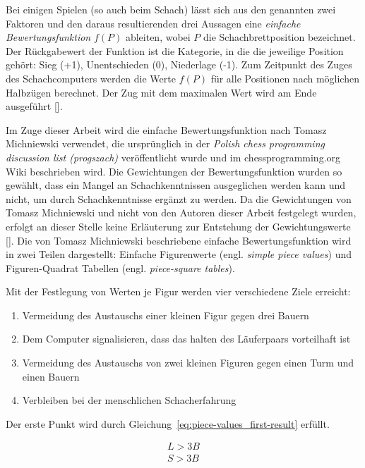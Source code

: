 \noindent Bei einigen Spielen (so auch beim Schach) lässt sich aus den genannten zwei Faktoren und den daraus resultierenden drei Aussagen eine \textit{einfache Bewertungsfunktion} \(\displaystyle f(P)\) ableiten, wobei \(\displaystyle P\) die Schachbrettposition bezeichnet.
Der Rückgabewert der Funktion ist die Kategorie, in die die jeweilige Position gehört: Sieg (+1), Unentschieden (0), Niederlage (-1).
Zum Zeitpunkt des Zuges des Schachcomputers werden die Werte \(\displaystyle f(P)\) für alle Positionen nach möglichen Halbzügen berechnet.
Der Zug mit dem maximalen Wert wird am Ende ausgeführt [\cite{Shannon1950}].

Im Zuge dieser Arbeit wird die einfache Bewertungsfunktion nach Tomasz Michniewski verwendet, die ursprünglich in der \textit{Polish chess programming discussion list (progszach)} veröffentlicht wurde und im chessprogramming.org Wiki beschrieben wird.
Die Gewichtungen der Bewertungsfunktion wurden so gewählt, dass ein Mangel an Schachkenntnissen ausgeglichen werden kann und nicht, um durch Schachkenntnisse ergänzt zu werden.
Da die Gewichtungen von Tomasz Michniewski und nicht von den Autoren dieser Arbeit festgelegt wurden, erfolgt an dieser Stelle keine Erläuterung zur Entstehung der Gewichtungswerte [\cite{Wiki2018}]. Die von Tomasz Michniewski beschriebene einfache Bewertungsfunktion wird in zwei Teilen dargestellt: Einfache Figurenwerte (engl. \textit{simple piece values}) und Figuren-Quadrat Tabellen (engl. \textit{piece-square tables}).

Mit der Festlegung von Werten je Figur werden vier verschiedene Ziele erreicht:

\begin{enumerate}
    \item Vermeidung des Austauschs einer kleinen Figur gegen drei Bauern
    \item Dem Computer signalisieren, dass das halten des Läuferpaars vorteilhaft ist
    \item Vermeidung des Austauschs von zwei kleinen Figuren gegen einen Turm und einen Bauern
    \item Verbleiben bei der menschlichen Schacherfahrung
\end{enumerate}

\noindent Der erste Punkt wird durch Gleichung~\ref{eq:piece-values_first-result} erfüllt.

\begin{equation} \label{eq:piece-values_first-result}
\begin{split}
    L > 3B \\
    S > 3B
\end{split}
\end{equation}

